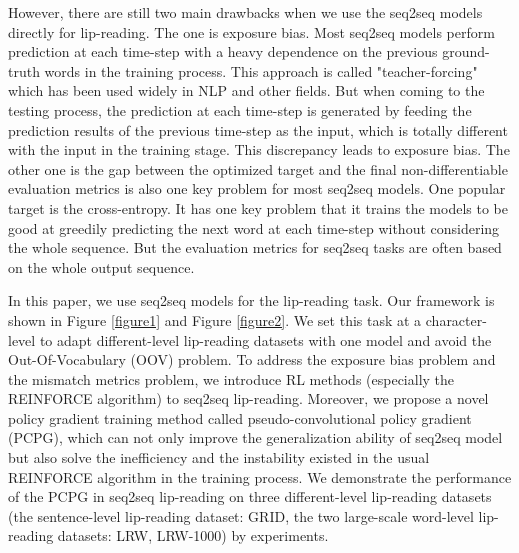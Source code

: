 \documentclass{bmvc2k}
\begin{document}
	However, there are still two main drawbacks when we use the seq2seq models directly for lip-reading. 
	The one is exposure bias\cite{Chopra2016}. Most seq2seq models perform prediction at each time-step with a heavy dependence on the previous ground-truth words in the training process. This approach is called "teacher-forcing"\cite{Rennie} which has been used widely in NLP and other fields. But when coming to the testing process, the prediction at each time-step is generated by feeding the prediction results of the previous time-step as the input, which is totally different with the input in the training stage. This discrepancy leads to exposure bias. The other one is the gap between the optimized target and the final non-differentiable evaluation metrics is also one key problem for most seq2seq models\cite{Chopra2016}. One popular target is the cross-entropy. It has one key problem that it trains the models to be good at greedily predicting the next word at each time-step without considering the whole sequence\cite{Chopra2016}. But the evaluation metrics for seq2seq tasks are often based on the whole output sequence.
	
	In this paper, we use seq2seq models for the lip-reading task. Our framework is shown in Figure \ref{figure1} and Figure \ref{figure2}. We set this task at a character-level to adapt different-level lip-reading datasets with one model and avoid the Out-Of-Vocabulary (OOV) problem. To address the exposure bias problem and the mismatch metrics problem, we introduce RL methods (especially the REINFORCE algorithm) to seq2seq lip-reading. Moreover, we propose a novel policy gradient training method called pseudo-convolutional policy gradient (PCPG), which can not only improve the generalization ability of seq2seq model but also solve the inefficiency and the instability existed in the usual REINFORCE algorithm in the training process. We demonstrate the performance of the PCPG in seq2seq lip-reading on three different-level lip-reading datasets (the sentence-level lip-reading dataset: GRID, the two large-scale word-level lip-reading datasets: LRW, LRW-1000) by experiments. 
	\vspace{-0.3cm}
\end{document}
